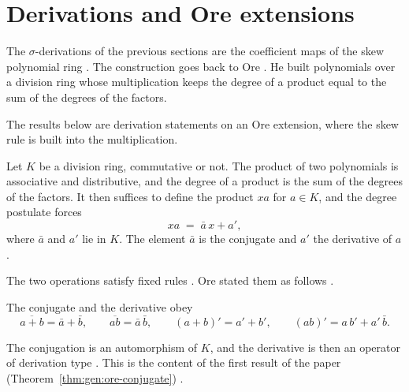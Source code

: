 \section{Derivations and Ore extensions}\label{sec:generalized-twisted:ore-extensions}

The $\sigma$-derivations of the previous sections are the coefficient maps of
the skew polynomial ring \cite[p.~2838]{Chuang2017Auto}. The construction goes
back to Ore \cite[p.~480]{Ore1933}. He built polynomials over a division ring
whose multiplication keeps the degree of a product equal to the sum of the
degrees of the factors.

The results below are derivation statements on an Ore extension, where the skew rule is built into the multiplication.

\begin{definition}\label{def:gen:ore-product}
Let $K$ be a division ring, commutative or not. The product of two polynomials
is associative and distributive, and the degree of a product is the sum of the
degrees of the factors. It then suffices to define the product $xa$ for
$a\in K$, and the degree postulate forces
\begin{equation*}
x a \;=\; \bar{a}\, x + a',
\end{equation*}
where $\bar a$ and $a'$ lie in $K$. The element $\bar a$ is the conjugate and
$a'$ the derivative of $a$.
\end{definition}

The two operations satisfy fixed rules
\cite[p.~482]{Ore1933}. Ore stated them as follows \cite[(4)--(5), p.~482]{Ore1933}.

\begin{remark}\label{rem:gen:ore-rules}
The conjugate and the derivative obey
\begin{equation*}
\overline{a+b}=\bar a+\bar b,\qquad \overline{ab}=\bar a\,\bar b,
\qquad (a+b)'=a'+b',\qquad (ab)'=a\,b'+a'\,\bar b .
\end{equation*}
\end{remark}

The conjugation is an automorphism of $K$, and the derivative is then an
operator of derivation type \cite[p.~482]{Ore1933}. This is the content of the
first result of the paper (Theorem~\ref{thm:gen:ore-conjugate}) \cite[Theorem~1, p.~482]{Ore1933}.

